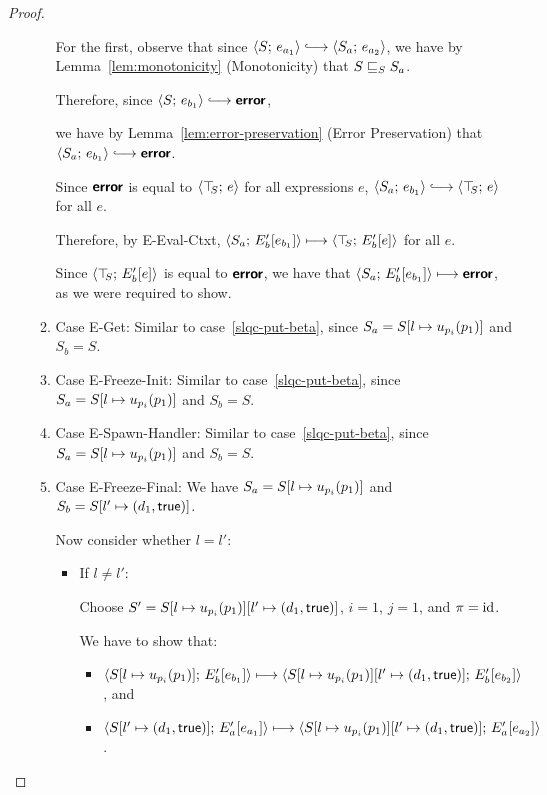 \begin{proof}
\begin{enumerate}
\begin{enumerate}
      For the first, observe that since $\config{S}{e_{a_1}}
      \parstepsto \config{S_a}{e_{a_2}}$, we have by
      Lemma~\ref{lem:monotonicity} (Monotonicity) that
      $S \sqsubseteq_S S_a$.

      Therefore, since $\config{S}{e_{b_1}} \parstepsto \error$,

      we have by Lemma~\ref{lem:error-preservation} (Error
      Preservation) that $\config{S_a}{e_{b_1}} \parstepsto \error$.
      
      Since $\textbf{\textsf{error}}$ is equal to $\langle \top\hspace{-0.85mm}_{S};\, e \rangle$ for all
      expressions $e$, $\config{S_a}{e_{b_1}} \parstepsto
      \config{\topS}{e}$ for all $e$.

      Therefore, by {\sc E-Eval-Ctxt},
      $\langle S_a;\, E'_b\hspace{-0.5mm}\left[e_{b_1}\right] \rangle \longmapsto
      \langle \top\hspace{-0.85mm}_{S};\, E'_b\hspace{-0.5mm}\left[e\right] \rangle$ for all $e$.

      Since $\langle \top\hspace{-0.85mm}_{S};\, E'_b\hspace{-0.5mm}\left[e\right] \rangle$ is equal to $\textbf{\textsf{error}}$,
      we have that $\langle S_a;\, E'_b\hspace{-0.5mm}\left[e_{b_1}\right] \rangle \longmapsto
      \textbf{\textsf{error}}$, as we were required to show.

    \item \label{slqc-put-get}Case {\sc E-Get}: Similar to
      case~\ref{slqc-put-beta}, since $S_a =
      S[l \mapsto u_{p_i}(p_1)]$ and $S_b = S$.
    \item \label{slqc-put-freeze-init}Case {\sc E-Freeze-Init}:
      Similar to case~\ref{slqc-put-beta}, since $S_a =
      S[l \mapsto u_{p_i}(p_1)]$ and $S_b = S$.
    \item \label{slqc-put-spawn-handler}Case {\sc E-Spawn-Handler}:
      Similar to case~\ref{slqc-put-beta}, since $S_a =
      S[l \mapsto u_{p_i}(p_1)]$ and $S_b = S$.
    \item \label{slqc-put-freeze-final}Case {\sc E-Freeze-Final}: We
      have $S_a = S[l \mapsto u_{p_i}(p_1)]$ and $S_b =
      S[l' \mapsto (d_1, \textsf{true})]$.

      Now consider whether $l = l'$:
      \begin{itemize}
      \item If $l \neq l'$:

        Choose $S' =
        S[l \mapsto u_{p_i}(p_1)][l' \mapsto (d_1, \textsf{true})]$,
        $i = 1$, $j = 1$, and $\pi = \mathrm{id}$.

        We have to show that:
        \begin{itemize}
        \item
          $\langle S[l \mapsto u_{p_i}(p_1)];\, E'_b\hspace{-0.5mm}\left[e_{b_1}\right] \rangle
          \longmapsto
          \langle S[l \mapsto u_{p_i}(p_1)][l' \mapsto (d_1, \textsf{true})];\, E'_b\hspace{-0.5mm}\left[e_{b_2}\right] \rangle$,
          and
        \item
          $\langle S[l' \mapsto (d_1, \textsf{true})];\, E'_a\hspace{-0.5mm}\left[e_{a_1}\right] \rangle
          \longmapsto
          \langle S[l \mapsto u_{p_i}(p_1)][l' \mapsto (d_1, \textsf{true})];\, E'_a\hspace{-0.5mm}\left[e_{a_2}\right] \rangle$.
        \end{itemize}


\end{itemize}
\end{enumerate}
\end{enumerate}
\end{proof}
